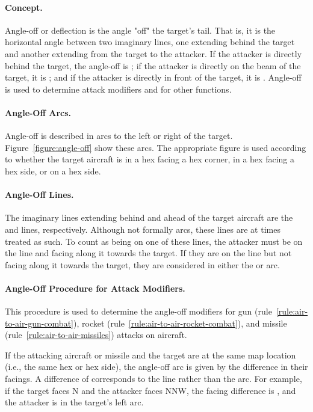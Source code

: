 {}{

\paragraph{Concept.} Angle-off or deflection is the angle "off" the target's tail. That is, it is the horizontal angle between two imaginary lines, one extending behind the target and another extending from the target to the attacker. If the attacker is directly behind the target, the angle-off is ; if the attacker is directly on the beam of the target, it is ; and if the attacker is directly in front of the target, it is . Angle-off is used to determine attack modifiers and for other functions. 

\paragraph{Angle-Off Arcs.} Angle-off is described in  arcs to the left or right of the target. Figure~\ref{figure:angle-off} show these arcs. The appropriate figure is used according to whether the target aircraft is in a hex facing a hex corner, in a hex facing a hex side, or on a hex side.

\paragraph{Angle-Off Lines.} The imaginary lines extending behind and ahead of the target aircraft are the  and  lines, respectively. Although not formally arcs, these lines are at times treated as such. To count as being on one of these lines, the attacker must be on the line and facing along it towards the target. If they are on the line but not facing along it towards the target, they are considered in either the  or  arc.

\paragraph{Angle-Off Procedure for Attack Modifiers.}
This procedure is used to determine the angle-off modifiers for gun (rule~\ref{rule:air-to-air-gun-combat}), rocket (rule~\ref{rule:air-to-air-rocket-combat}), and missile (rule~\ref{rule:air-to-air-missiles}) attacks on aircraft.

If the attacking aircraft or missile and the target are at the same map location (i.e., the same hex or hex side), the angle-off arc is given by the difference in their facings. A difference of  corresponds to the  line rather than the  arc. For example, if the target faces N and the attacker faces NNW, the facing difference is , and the attacker is in the target's left  arc.

}
